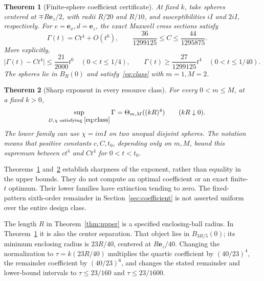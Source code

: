 \documentclass[11pt]{article}
\newtheorem{theorem}{Theorem}[section]
\newcommand{\abs}[1]{\lvert #1\rvert}
\newcommand{\ex}{\mathbf e_x}
\newcommand{\ez}{\mathbf e_z}
\begin{document}
\begin{theorem}[Finite-sphere coefficient certificate]\label{thm:hetero}
At fixed $k$, take spheres centered at $\mp R\ez/2$, with radii $R/20$ and $R/10$, and susceptibilities $iI$ and $2iI$, respectively. For $e=\ex,d=\ez$, the exact Maxwell cross sections satisfy
\begin{equation}\label{eq:hetero-C}
 \Gamma(t)=Ct^4+O(t^6),\qquad
 \frac{36}{1299125}\leq C\leq\frac{44}{1295875}.
\end{equation}
More explicitly,
\begin{equation}\label{eq:hetero-remainder}
 \abs{\Gamma(t)-Ct^4}\leq\frac{21}{2000}t^6\quad(0<t\leq1/4),
 \qquad \Gamma(t)\geq\frac{27}{1299125}t^4\quad(0<t\leq1/40).
\end{equation}
The spheres lie in $B_R(0)$ and satisfy~\eqref{eq:class} with $m=1,M=2$.
\end{theorem}

\begin{theorem}[Sharp exponent in every resource class]\label{thm:sharp}
For every $0<m\leq M$, at a fixed $k>0$,
\begin{equation}\label{eq:theta}
 \sup_{D,\chi\text{ satisfying }\eqref{eq:class}}\Gamma
   =\Theta_{m,M}((kR)^4)\qquad(kR\downarrow0).
\end{equation}
The lower family can use $\chi=imI$ on two unequal disjoint spheres. The notation means that positive constants $c,C,t_0$, depending only on $m,M$, bound this supremum between $ct^4$ and $Ct^4$ for $0<t<t_0$.
\end{theorem}

Theorems~\ref{thm:hetero} and~\ref{thm:sharp} establish sharpness of the exponent, rather than equality in the upper bounds. They do not compute an optimal coefficient or an exact finite-$t$ optimum. Their lower families have extinction tending to zero. The fixed-pattern sixth-order remainder in Section~\ref{sec:coefficient} is not asserted uniform over the entire design class.

The length $R$ in Theorem~\ref{thm:upper} is a specified enclosing-ball radius. In Theorem~\ref{thm:hetero} it is also the center separation. That object lies in $B_{3R/5}(0)$; its minimum enclosing radius is $23R/40$, centered at $R\ez/40$. Changing the normalization to $\tau=k(23R/40)$ multiplies the quartic coefficient by $(40/23)^4$, the remainder coefficient by $(40/23)^6$, and changes the stated remainder and lower-bound intervals to $\tau\leq23/160$ and $\tau\leq23/1600$.
\end{document}
